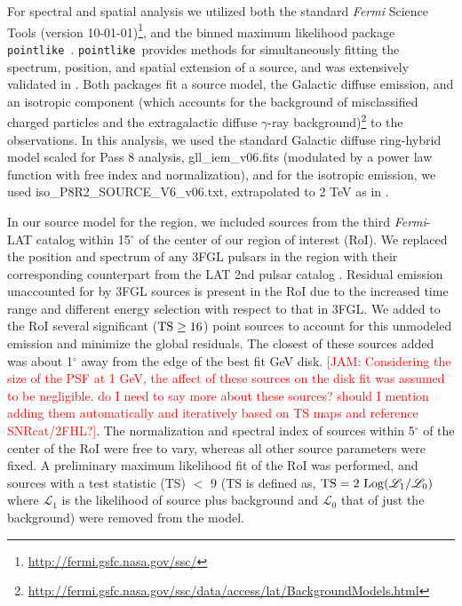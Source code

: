 \documentclass[iop]{emulateapj}
\newcommand{\kibitz}[2]{\ifnum\Comments=1\textcolor{#1}{#2}\fi}
\newcommand{\jamie}[1]{\kibitz{red}      {[JAM: #1]}}
\newcommand{\gam}{$\gamma$-ray}
\newcommand{\Fermi}{\emph{Fermi}}  %
\newcommand{\FermiLat}{\emph{Fermi}-LAT }     %
\newcommand{\ptlike}{{\tt pointlike}}
\begin{document}
For spectral and spatial analysis we utilized both the standard \Fermi{} Science Tools (version 10-01-01)\footnote[1]{\url{http://fermi.gsfc.nasa.gov/ssc/}}, and the binned maximum likelihood package \ptlike~\citep{Kerr10}. \ptlike~provides methods for simultaneously fitting the spectrum, position, and spatial extension of a source, and was extensively validated in \cite{Lande12}. Both packages fit a source model, the Galactic diffuse emission, and an isotropic component (which accounts for the background of misclassified charged particles and the extragalactic diffuse \gam{}  background)\footnote[2]{\url{http://fermi.gsfc.nasa.gov/ssc/data/access/lat/BackgroundModels.html}} to the observations. In this analysis, we used the standard Galactic diffuse ring-hybrid model scaled for Pass 8 analysis, gll{\_}iem{\_}v06.fits (modulated by a power law function with free index and normalization), and for the isotropic emission,  we used iso{\_}P8R2{\_}SOURCE{\_}V6{\_}v06.txt, extrapolated to 2 TeV as in \cite{2FHL}.

In our source model for the region, we included sources from the third \FermiLat catalog \citep[3FGL]{3FGL} within 15$^\circ$ of the center of our region of interest (RoI). We replaced the position and spectrum of any 3FGL pulsars in the region with their corresponding counterpart  from the LAT 2nd pulsar catalog \citep{2PC}.  Residual emission unaccounted for by 3FGL sources is present in the RoI due to the increased time range and different energy selection with respect to that in 3FGL. We added to the RoI several significant (${\rm TS \geq 16}$) point sources to account for this unmodeled emission and minimize the global residuals. The closest of these sources added was about 1$^{\circ}$ away from the edge of the best fit GeV disk. \jamie{ Considering the size of the PSF at 1 GeV, the affect of these sources on the disk fit was assumed to be  negligible. do I need to say more about these sources? should I mention adding them automatically and iteratively based on TS maps and reference SNRcat/2FHL?}.  The normalization and spectral index of sources within 5$^{\circ}$ of the center of the RoI were free to vary, whereas all other source parameters were fixed. A preliminary maximum likelihood fit of the RoI was performed, and  sources with a test statistic (TS) $<$ 9 (TS is defined as,  ${\rm TS}=2~{\rm Log}(\mathcal{L}_1 / \mathcal{L}_0)$ where $\mathcal{L}_1$ 
 is the likelihood of source plus background and  $\mathcal{L}_0$ that of just the background) were removed from the model. 
\end{document}
